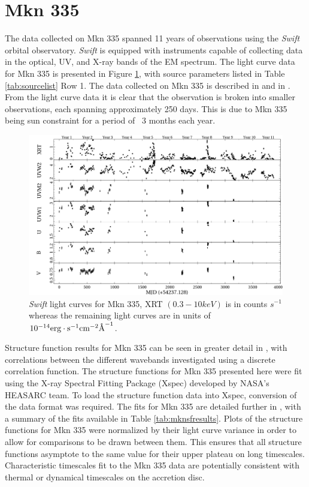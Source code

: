 \documentclass[12pt, oneside]{smuthesis}
\begin{document}
\section{\sc Mkn 335}\label{mkn335}

The data collected on Mkn 335 spanned 11 years of observations using the \textit{Swift} orbital observatory. \textit{Swift} is equipped with instruments capable of collecting data in the optical, UV, and X-ray bands of the EM spectrum. The light curve data for Mkn 335 is presented in Figure \ref{fig:mkn335lc}, with source parameters listed in Table \ref{tab:sourcelist} Row 1. The data collected on Mkn 335 is described in \cite{galloblue} and in \cite{grupe2012}. From the light curve data it is clear that the observation is broken into smaller observations, each spanning approximately 250 days. This is due to Mkn 335 being sun constraint for a period of ~3 months each year.

\begin{figure}[H]
	\centering
	\includegraphics[width=\linewidth]{mkn335Lightcurves}
	\caption{\textit{Swift} light curves for Mkn 335, XRT $(0.3-10keV)$ is in counts $s^{-1}$ whereas the remaining light curves are in units of $10^{-14}\textup{erg}\cdot \textup{s}^{-1}\textup{cm}^{-2}\textup{\AA{}}^{-1}$.}
	\label{fig:mkn335lc}
\end{figure}

Structure function results for Mkn 335 can be seen in greater detail in \cite{galloblue}, with correlations between the different wavebands investigated using a discrete correlation function. The structure functions for Mkn 335 presented here were fit using the X-ray Spectral Fitting Package (Xspec) developed by NASA's HEASARC team. To load the structure function data into Xspec, conversion of the data format was required. The fits for Mkn 335 are detailed further in \cite{galloblue}, with a summary of the fits available in Table \ref{tab:mknsfresults}. Plots of the structure functions for Mkn 335 were normalized by their light curve variance in order to allow for comparisons to be drawn between them. This ensures that all structure functions asymptote to the same value for their upper plateau on long timescales. Characteristic timescales fit to the Mkn 335 data are potentially consistent with thermal or dynamical timescales on the accretion disc.
\end{document}
